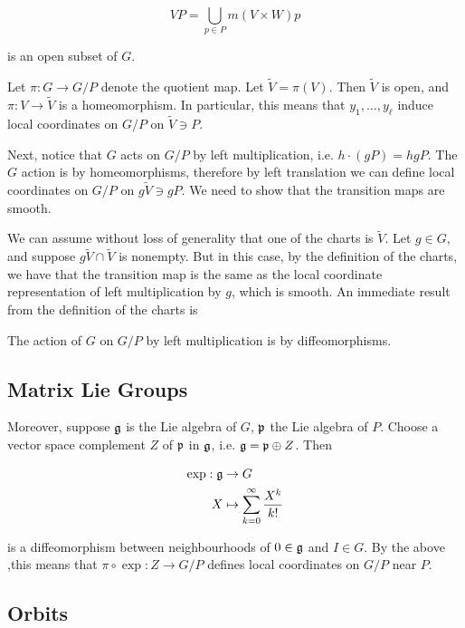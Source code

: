 \documentclass{article}
\renewcommand{\tilde}{\widetilde}
\begin{document}
\[VP = \bigcup_{p \in P}m(V \times W)p\]

is an open subset of \(G\).

Let \(\pi : G \to G/P\) denote the quotient map. Let \(\tilde V = \pi(V)\). Then \(\tilde V\) is open, and \(\pi : V \to \tilde V\) is a homeomorphism. In particular, this means that \(y_1 , \dots, y_\ell\) induce local coordinates on \(G/P\) on \(\tilde V \ni P\).

Next, notice that \(G\) acts on \(G/P\) by left multiplication, i.e. \(h \cdot (gP) = hgP\). The \(G\) action is by homeomorphisms, therefore by left translation we can define local coordinates on \(G/P\) on \(g \tilde V \ni gP\). We need to show that the transition maps are smooth.

We can assume without loss of generality that one of the charts is \(\tilde V\). Let \(g \in G\), and suppose \(g \tilde V \cap \tilde V\) is nonempty. But in this case, by the definition of the charts, we have that the transition map is the same as the local coordinate representation of left multiplication by \(g\), which is smooth. An immediate result from the definition of the charts is

\begin{proposition}
    \label{prop:quot-mfd-left-diffeos} The action of \(G\) on \(G/P\) by left multiplication is by diffeomorphisms.
\end{proposition}

\subsection{Matrix Lie Groups}

\label{sec:matrix-lie-groups}

Moreover, suppose \(\mathfrak{g}\) is the Lie algebra of \(G\), \(\mathfrak{p}\) the Lie algebra of \(P\). Choose a vector space complement \(Z\) of \(\mathfrak{p}\) in \(\mathfrak{g}\), i.e. \(\mathfrak{g} = \mathfrak{p} \oplus Z\). Then

\begin{align*}
    \exp : \mathfrak{g} &\to G \\
    X &\mapsto \sum_{k=0}^\infty \frac{X^k}{k!}
\end{align*}

is a diffeomorphism between neighbourhoods of \(0 \in \mathfrak{g}\) and \(I \in G\). By the above ,this means that \(\pi \circ \exp : Z \to G/P\) defines local coordinates on \(G/P\) near \(P\).

\subsection{Orbits}
\end{document}
